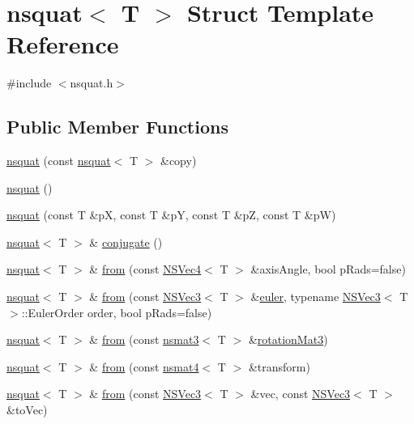 \hypertarget{structnsquat}{\section{nsquat$<$ T $>$ Struct Template Reference}
\label{structnsquat}
}


{\ttfamily \#include $<$nsquat.\-h$>$}

\subsection*{Public Member Functions}
\begin{DoxyCompactItemize}
\item 
\hyperlink{structnsquat_a95a3a372cf06d1b2a88543193a8f3668}{nsquat} (const \hyperlink{structnsquat}{nsquat}$<$ T $>$ \&copy)
\item 
\hyperlink{structnsquat_a003ab193ffffff9992c6767272ba8ea8}{nsquat} ()
\item 
\hyperlink{structnsquat_ae0a6a2812b38da7e4496275dc1b17480}{nsquat} (const T \&p\-X, const T \&p\-Y, const T \&p\-Z, const T \&p\-W)
\item 
\hyperlink{structnsquat}{nsquat}$<$ T $>$ \& \hyperlink{structnsquat_a66431cd90e24922e76c551e4ecf3d644}{conjugate} ()
\item 
\hyperlink{structnsquat}{nsquat}$<$ T $>$ \& \hyperlink{structnsquat_a6aa0a1e7bc7bbdf707d4dd11f9a20014}{from} (const \hyperlink{structNSVec4}{N\-S\-Vec4}$<$ T $>$ \&axis\-Angle, bool p\-Rads=false)
\item 
\hyperlink{structnsquat}{nsquat}$<$ T $>$ \& \hyperlink{structnsquat_a8030b2163b53da98492a94b54ef91e6d}{from} (const \hyperlink{structNSVec3}{N\-S\-Vec3}$<$ T $>$ \&\hyperlink{nsvec3_8h_ac03cece5b2ce21941bb4b4a02ea7e2b6}{euler}, typename \hyperlink{structNSVec3}{N\-S\-Vec3}$<$ T $>$\-::Euler\-Order order, bool p\-Rads=false)
\item 
\hyperlink{structnsquat}{nsquat}$<$ T $>$ \& \hyperlink{structnsquat_ae1f98c2170351e831ceb38402a786b6c}{from} (const \hyperlink{structnsmat3}{nsmat3}$<$ T $>$ \&\hyperlink{nsmat3_8h_ad4de391de75c02e722b41b139734200b}{rotation\-Mat3})
\item 
\hyperlink{structnsquat}{nsquat}$<$ T $>$ \& \hyperlink{structnsquat_a0afab450c7c9c53219d02b808e5e32d4}{from} (const \hyperlink{structnsmat4}{nsmat4}$<$ T $>$ \&transform)
\item 
\hyperlink{structnsquat}{nsquat}$<$ T $>$ \& \hyperlink{structnsquat_a9cf2a558c337517d636eea59fc88208c}{from} (const \hyperlink{structNSVec3}{N\-S\-Vec3}$<$ T $>$ \&vec, const \hyperlink{structNSVec3}{N\-S\-Vec3}$<$ T $>$ \&to\-Vec)

\end{DoxyCompactItemize}
